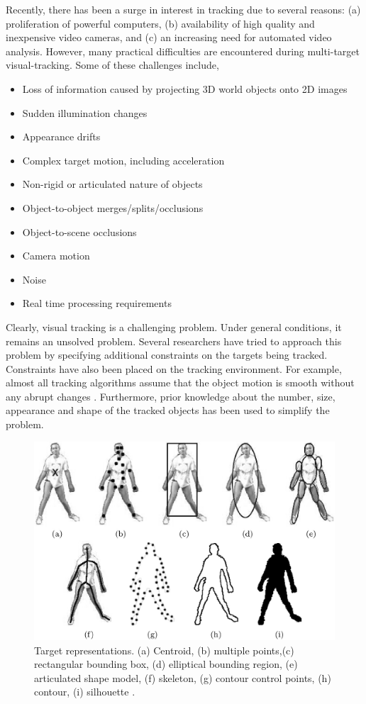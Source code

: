 Recently, there has been a surge in interest in tracking due to several reasons: (a) proliferation of powerful computers, (b) availability of high quality and inexpensive video cameras, and (c) an increasing need for automated video analysis.  However, many practical difficulties are encountered during multi-target visual-tracking.  Some of these challenges include, 

\begin{itemize}
\item Loss of information caused by projecting 3D world objects onto 2D images
\item Sudden illumination changes
\item Appearance drifts
\item Complex target motion, including acceleration
\item Non-rigid or articulated nature of objects
\item Object-to-object merges/splits/occlusions
\item Object-to-scene occlusions
\item Camera motion
\item Noise
\item Real time processing requirements
\end{itemize} 

Clearly, visual tracking is a challenging problem.  Under general conditions, it remains an unsolved problem.  Several researchers have tried to approach this problem by specifying additional constraints on the targets being tracked.  Constraints have also been placed on the tracking environment.  For example, almost all tracking algorithms assume that the object motion is smooth without any abrupt changes \cite{2006_JNL_SURVEYtrk_Yilmaz}.  Furthermore, prior knowledge about the number, size, appearance and shape of the tracked objects has been used to simplify the problem.  

\begin{figure}[t]
	\center
	\includegraphics[width=1.0\textwidth]{thesis/2006_JNL_TRKsurvey_Shah_fig1.png}
	\caption{Target representations.  (a) Centroid, (b) multiple points,(c) rectangular bounding box, (d) elliptical bounding region, (e) articulated shape model, (f) skeleton, (g) contour control points, (h) contour, (i) silhouette \cite{2006_JNL_SURVEYtrk_Yilmaz}.}
	\label{fig:TRK_objectRepresentations}
\end{figure}


